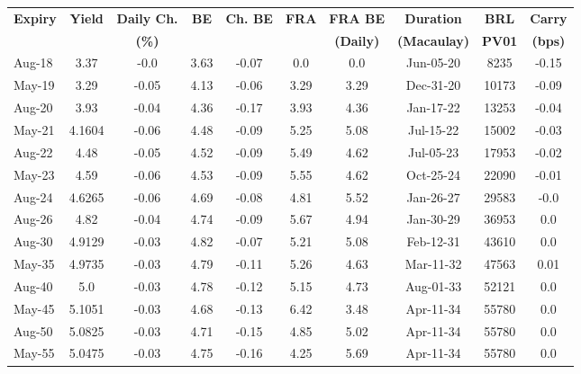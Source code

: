 \documentclass[article,crop=false]{standalone}%
\begin{document}
%
\normalsize%
\setlength{\tabcolsep}{0.15cm}%
\begin{tabular}[h]{l|c c|c c|c c|c c c}%
\hline%
\rowcolor{white}%
\textbf{Expiry}&\textbf{Yield}&\textbf{Daily Ch.}&\textbf{BE}&\textbf{Ch. BE}&\textbf{FRA}&\textbf{FRA BE}&\textbf{Duration}&\textbf{BRL}&\textbf{Carry}\\%
\rowcolor{white}%
\textbf{}&\textbf{}&\textbf{(\%)}&\textbf{}&\textbf{}&\textbf{}&\textbf{(Daily)}&\textbf{(Macaulay)}&\textbf{PV01}&\textbf{(bps)}\\%
\hline%
\rowcolor{lightgray}%
Aug{-}18&3.37&{-}0.0&3.63&{-}0.07&0.0&0.0&Jun{-}05{-}20&8235&{-}0.15\\%
\rowcolor{white}%
May{-}19&3.29&{-}0.05&4.13&{-}0.06&3.29&3.29&Dec{-}31{-}20&10173&{-}0.09\\%
\rowcolor{lightgray}%
Aug{-}20&3.93&{-}0.04&4.36&{-}0.17&3.93&4.36&Jan{-}17{-}22&13253&{-}0.04\\%
\rowcolor{white}%
May{-}21&4.1604&{-}0.06&4.48&{-}0.09&5.25&5.08&Jul{-}15{-}22&15002&{-}0.03\\%
\rowcolor{lightgray}%
Aug{-}22&4.48&{-}0.05&4.52&{-}0.09&5.49&4.62&Jul{-}05{-}23&17953&{-}0.02\\%
\rowcolor{white}%
May{-}23&4.59&{-}0.06&4.53&{-}0.09&5.55&4.62&Oct{-}25{-}24&22090&{-}0.01\\%
\rowcolor{lightgray}%
Aug{-}24&4.6265&{-}0.06&4.69&{-}0.08&4.81&5.52&Jan{-}26{-}27&29583&{-}0.0\\%
\rowcolor{white}%
Aug{-}26&4.82&{-}0.04&4.74&{-}0.09&5.67&4.94&Jan{-}30{-}29&36953&0.0\\%
\rowcolor{lightgray}%
Aug{-}30&4.9129&{-}0.03&4.82&{-}0.07&5.21&5.08&Feb{-}12{-}31&43610&0.0\\%
\rowcolor{white}%
May{-}35&4.9735&{-}0.03&4.79&{-}0.11&5.26&4.63&Mar{-}11{-}32&47563&0.01\\%
\rowcolor{lightgray}%
Aug{-}40&5.0&{-}0.03&4.78&{-}0.12&5.15&4.73&Aug{-}01{-}33&52121&0.0\\%
\rowcolor{white}%
May{-}45&5.1051&{-}0.03&4.68&{-}0.13&6.42&3.48&Apr{-}11{-}34&55780&0.0\\%
\rowcolor{lightgray}%
Aug{-}50&5.0825&{-}0.03&4.71&{-}0.15&4.85&5.02&Apr{-}11{-}34&55780&0.0\\%
\rowcolor{white}%
May{-}55&5.0475&{-}0.03&4.75&{-}0.16&4.25&5.69&Apr{-}11{-}34&55780&0.0\\%
\hline%
\end{tabular}%
\end{document}

